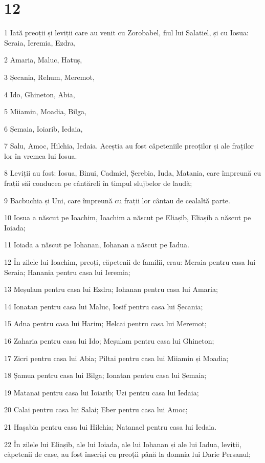 \chapter{12}

\par 1 Iată preoții și leviții care au venit cu Zorobabel, fiul lui Salatiel, și cu Iosua: Seraia, Ieremia, Ezdra,
\par 2 Amaria, Maluc, Hatuș,
\par 3 Șecania, Rehum, Meremot,
\par 4 Ido, Ghineton, Abia,
\par 5 Miiamin, Moadia, Bilga,
\par 6 Șemaia, Ioiarib, Iedaia,
\par 7 Salu, Amoc, Hilchia, Iedaia. Aceștia au fost căpeteniile preoților și ale fraților lor în vremea lui Iosua.
\par 8 Leviții au fost: Iosua, Binui, Cadmiel, Șerebia, Iuda, Matania, care împreună cu frații săi conducea pe cântăreli în timpul slujbelor de laudă;
\par 9 Bacbuchia și Uni, care împreună cu frații lor cântau de cealaltă parte.
\par 10 Iosua a născut pe Ioachim, Ioachim a născut pe Eliașib, Eliașib a născut pe Ioiada;
\par 11 Ioiada a născut pe Iohanan, Iohanan a născut pe Iadua.
\par 12 În zilele lui Ioachim, preoți, căpetenii de familii, erau: Meraia pentru casa lui Seraia; Hanania pentru casa lui Ieremia;
\par 13 Meșulam pentru casa lui Ezdra; Iohanan pentru casa lui Amaria;
\par 14 Ionatan pentru casa lui Maluc, Iosif pentru casa lui Șecania;
\par 15 Adna pentru casa lui Harim; Helcai pentru casa lui Meremot;
\par 16 Zaharia pentru casa lui Ido; Meșulam pentru casa lui Ghineton;
\par 17 Zicri pentru casa lui Abia; Piltai pentru casa lui Miiamin și Moadia;
\par 18 Șamua pentru casa lui Bilga; Ionatan pentru casa lui Șemaia;
\par 19 Matanai pentru casa lui Ioiarib; Uzi pentru casa lui Iedaia;
\par 20 Calai pentru casa lui Salai; Eber pentru casa lui Amoc;
\par 21 Hașabia pentru casa lui Hilchia; Natanael pentru casa lui Iedaia.
\par 22 În zilele lui Eliașib, ale lui Ioiada, ale lui Iohanan și ale lui Iadua, leviții, căpetenii de case, au fost înscriși cu preoții până la domnia lui Darie Persanul;
